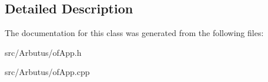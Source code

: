 \subsection{Detailed Description}


The documentation for this class was generated from the following files\+:\begin{DoxyCompactItemize}
\item 
src/\+Arbutus/of\+App.\+h\item 
src/\+Arbutus/of\+App.\+cpp\end{DoxyCompactItemize}
